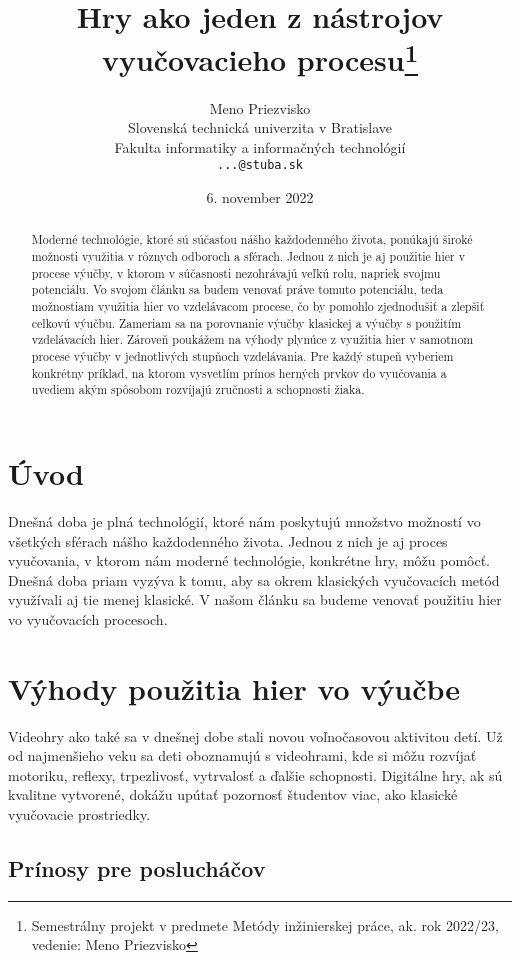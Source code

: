\documentclass[10pt,twoside,slovak,a4paper]{article}
\title{Hry ako jeden z nástrojov vyučovacieho procesu\thanks{Semestrálny projekt v predmete Metódy inžinierskej práce, ak. rok 2022/23, vedenie: Meno Priezvisko}}
\author{Meno Priezvisko\\[2pt]
	{\small Slovenská technická univerzita v Bratislave}\\
	{\small Fakulta informatiky a informačných technológií}\\
	{\small \texttt{...@stuba.sk}}
	}
\date{\small 6. november 2022}
\begin{document}
\maketitle

\begin{abstract}

Moderné technológie, ktoré sú súčasťou nášho každodenného života, ponúkajú široké možnosti využitia v rôznych odboroch a sférach. Jednou z nich je aj použitie hier v procese výučby\cite{Zea2009-eh}, v ktorom v súčasnosti nezohrávajú veľkú rolu, napriek svojmu potenciálu. Vo svojom článku sa budem venovať práve tomuto potenciálu, teda možnostiam využitia hier vo vzdelávacom procese, čo by pomohlo zjednodušiť a zlepšiť celkovú výučbu. Zameriam sa na porovnanie výučby klasickej a výučby s použitím vzdelávacích hier. Zároveň poukážem na výhody plynúce z využitia hier v samotnom procese výučby v jednotlivých stupňoch vzdelávania. Pre každý stupeň vyberiem konkrétny príklad, na ktorom vysvetlím prínos herných prvkov do vyučovania a uvediem akým spôsobom rozvíjajú zručnosti a schopnosti žiaka.

\end{abstract}



\section{Úvod}

Dnešná doba je plná technológií, ktoré nám poskytujú množstvo možností vo všetkých sférach nášho každodenného života. Jednou z nich je aj proces vyučovania, v ktorom nám moderné technológie, konkrétne hry, môžu pomôcť. Dnešná doba priam vyzýva k tomu, aby sa okrem klasických vyučovacích metód využívali aj tie menej klasické. V našom článku sa budeme venovať použitiu hier vo vyučovacích procesoch.

\section{Výhody použitia hier vo výučbe}

Videohry ako také sa v dnešnej dobe stali novou voľnočasovou aktivitou detí. Už od najmenšieho veku sa deti oboznamujú s videohrami, kde si môžu rozvíjať motoriku, reflexy, trpezlivosť, vytrvalosť a ďalšie schopnosti. Digitálne hry, ak sú kvalitne vytvorené, dokážu upútať pozornosť študentov viac, ako klasické vyučovacie prostriedky.

\subsection{Prínosy pre poslucháčov}
\end{document}
